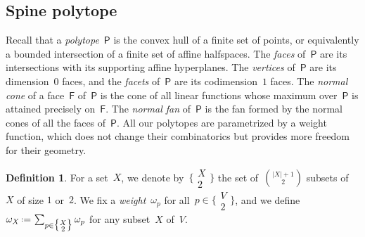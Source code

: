 \documentclass{amsart}
\theoremstyle{definition}
\newtheorem{definition}[theorem]{Definition}
\newcommand{\eqdef}{\mbox{\,\raisebox{0.2ex}{\scriptsize\ensuremath{\mathrm:}}\ensuremath{=}\,}} %
\newcommand{\darkblue}{\color{darkblue}} %
\newcommand{\defn}[1]{\textsl{\darkblue #1}} %
\newcommand{\vertexSet}{V}
\newcommand{\polytope}[1]{\mathsf{#1}} %
\newcommand{\weight}{\omega} %
\newcommand{\monombinom}[1]{\big\{\!\begin{smallmatrix} #1 \\ 2 \end{smallmatrix}\!\big\}}
\begin{document}

\subsection{Spine polytope}

Recall that a \defn{polytope}~$\polytope{P}$ is the convex hull of a finite set of points, or equivalently a bounded intersection of a finite set of affine halfspaces.
The \defn{faces} of~$\polytope{P}$ are its intersections with its supporting affine hyperplanes.
The \defn{vertices} of~$\polytope{P}$ are its dimension~$0$ faces, and the \defn{facets} of~$\polytope{P}$ are its codimension~$1$ faces.
The \defn{normal cone} of a face~$\polytope{F}$ of~$\polytope{P}$ is the cone of all linear functions whose maximum over~$\polytope{P}$ is attained precisely on~$\polytope{F}$.
The \defn{normal fan} of~$\polytope{P}$ is the fan formed by the normal cones of all the faces of~$\polytope{P}$.
All our polytopes are parametrized by a weight function, which does not change their combinatorics but provides more freedom for their geometry.

\begin{definition}
  \label{def:weight}
  For a set~$X$, we denote by~$\monombinom{X}$ the set of~$\binom{|X|+1}{2}$ subsets of~$X$ of size $1$ or~$2$.
  We fix a \defn{weight}~$\weight_p$ for all~$p \in \monombinom{\vertexSet}$, and we define~$\weight_X \eqdef \sum_{p \in \monombinom{X}} \weight_p$ for any subset~$X$ of~$\vertexSet$.
\end{definition}
\end{document}
